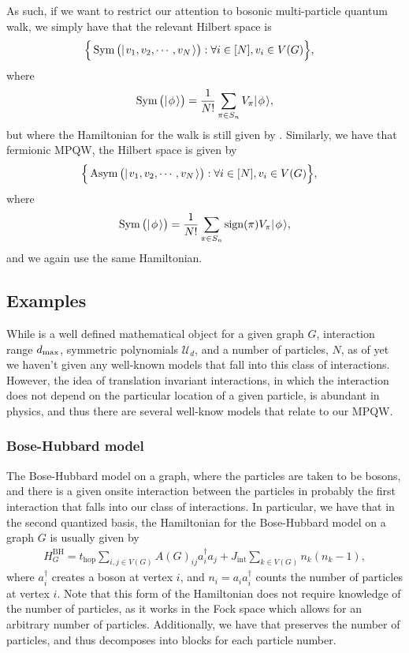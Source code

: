\documentclass[../thesis-main/thesis-main]{subfiles}
\begin{document}
As such, if we want to restrict our attention to bosonic multi-particle quantum walk, we simply have that the relevant Hilbert space is
\begin{align}
  \span\Big\{\Sym\big(\ket{v_1,v_2,\cdots,v_N} \big): \forall i\in [N], v_i\in V(G) \Big\},
\end{align}
where
\begin{align}
  \operatorname{Sym}\big(|\mspace{2mu} \phi \mspace{2mu} \rangle\big) = \frac{1}{N!} \sum_{\pi\in S_n} V_\pi |\mspace{2mu} \phi \mspace{2mu} \rangle,
\end{align}
but where the Hamiltonian for the walk is still given by .  Similarly, we have that fermionic MPQW, the Hilbert space is given by 
\begin{align}
  \span\Big\{\ASym\big(\ket{v_1,v_2,\cdots,v_N} \big): \forall i\in [N], v_i\in V(G) \Big\},
\end{align}
where
\begin{align}
  \operatorname{Sym}\big(|\mspace{2mu} \phi \mspace{2mu} \rangle\big) = \frac{1}{N!} \sum_{\pi\in S_n} \operatorname{sign}(\pi) V_\pi |\mspace{2mu} \phi \mspace{2mu} \rangle,
\end{align}
and we again use the same Hamiltonian.

\subsection{Examples}

While  is a well defined mathematical object for a given graph $G$, interaction range $d_{\text{max}}$, symmetric polynomials $\mathcal{U}_d$, and a number of particles, $N$, as of yet we haven't given any well-known models that fall into this class of interactions.  However, the idea of translation invariant interactions, in which the interaction does not depend on the particular location of a given particle, is abundant in physics, and thus there are several well-know models that relate to our MPQW.

\subsubsection{Bose-Hubbard model}

The Bose-Hubbard model on a graph, where the particles are taken to be bosons, and there is a given onsite interaction between the particles in probably the first interaction that falls into our class of interactions.  In particular, we have that in the second quantized basis, the Hamiltonian for the Bose-Hubbard model on a graph $G$ is usually given by 
\begin{align}
  H_{G}^{\text{BH}} = t_{\text{hop}} \sum_{i,j\in V(G)} A(G)_{ij} a_i^\dag a_j + J_\text{int} \sum_{k\in V(G)} n_k (n_k - 1), \label{eq:BH_H_Fock}
\end{align}
where $a_i^\dag$ creates a boson at vertex $i$, and $n_i = a_ia_i^\dag$ counts the number of particles at vertex $i$.  Note that this form of the Hamiltonian does not require knowledge of the number of particles, as it works in the Fock space which allows for an arbitrary number of particles.  Additionally, we have that  preserves the number of particles, and thus decomposes into blocks for each particle number.
\end{document}
